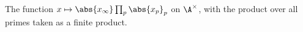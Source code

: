 The function $x\mapsto\abs{x_\infty}\prod_p\abs{x_p}_p$ on $\A^\times$, with the product over all primes taken as a finite product.
